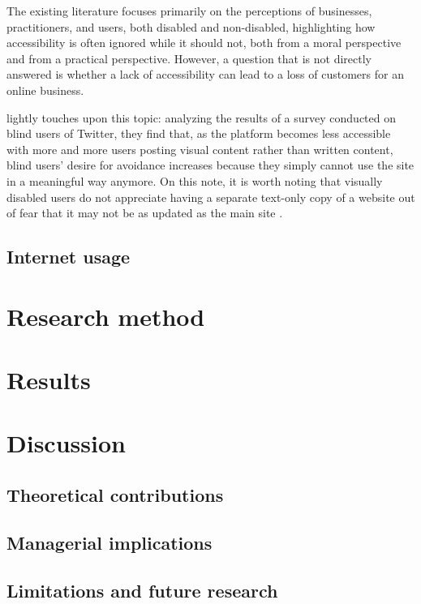 \documentclass[12pt, a4paper]{article}
\begin{document}
The existing literature focuses primarily on the perceptions of businesses,
practitioners, and users, both disabled and non-disabled, highlighting how
accessibility is often ignored while it should not, both from a moral perspective and
from a practical perspective. However, a question that is not directly answered is
whether a lack of accessibility can lead to a loss of customers for an online business.

 lightly touches upon this topic: analyzing the results of a survey
conducted on blind users of Twitter, they find that, as the platform becomes less
accessible with more and more users posting visual content rather than written content,
blind users' desire for avoidance increases because they simply cannot use the site in a
meaningful way anymore. On this note, it is worth noting that visually disabled users do
not appreciate having a separate text-only copy of a website out of fear that it may not
be as updated as the main site \cite{weeratunga2015}.

\subsection{Internet usage}\label{sec:internet-usage}

\section{Research method}

\section{Results}

\section{Discussion}
\subsection{Theoretical contributions}
\subsection{Managerial implications}
\subsection{Limitations and future research}

\newpage


\end{document}
